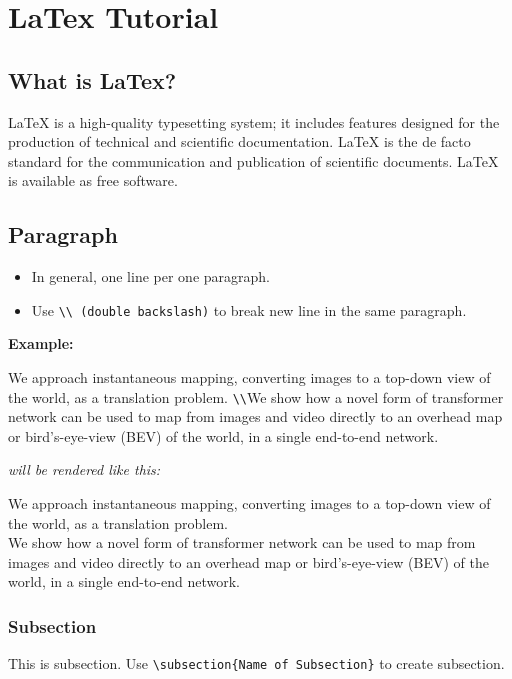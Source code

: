 \chapter{LaTex Tutorial}


\section{What is LaTex?}

La\TeX{} is a high-quality typesetting system; it includes features designed for the production of technical and scientific documentation. LaTeX is the de facto standard for the communication and publication of scientific documents. LaTeX is available as free software.


\section{Paragraph}

\begin{itemize}
  \item In general, one line per one paragraph.
  \item Use \verb|\\ (double backslash)| to break new line in the same paragraph.
\end{itemize}

\textbf{Example:}

We approach instantaneous mapping, converting images to a top-down view of the world, as a translation problem. \verb|\\|We show how a novel form of transformer network can be used to map from images and video directly to an overhead map or bird's-eye-view (BEV) of the world, in a single end-to-end network.

\emph{will be rendered like this:}

We approach instantaneous mapping, converting images to a top-down view of the world, as a translation problem. \\We show how a novel form of transformer network can be used to map from images and video directly to an overhead map or bird's-eye-view (BEV) of the world, in a single end-to-end network.

\subsection{Subsection}

This is subsection. Use \verb|\subsection{Name of Subsection}| to create subsection.